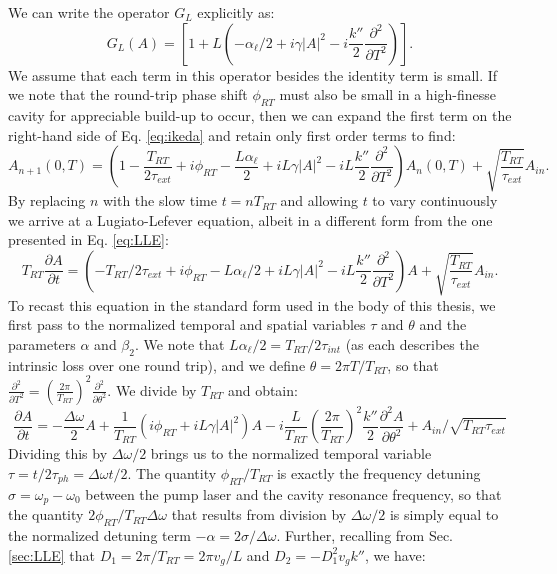 We can write the operator $G_L$ explicitly as:
\begin{equation}
G_L(A)=\left[1+L\left(-\alpha_\ell/2 +i\gamma|A|^2-i\frac{k''}{2} \frac{\partial^2 }{\partial T^2}\right)\right].
\end{equation}
We assume that each term in this operator besides the identity term is small. If we note that the round-trip phase shift $\phi_{RT}$ must also be small in a high-finesse cavity for appreciable build-up to occur, then we can expand the first term on the right-hand side of Eq. \ref{eq:ikeda} and retain only first order terms to find:
\begin{equation}
A_{n+1}(0,T)=\left(1-\frac{T_{RT}}{2\tau_{ext}}+i\phi_{RT}-\frac{L\alpha_\ell}{2}+iL\gamma|A|^2-iL\frac{k''}{2} \frac{\partial^2 }{\partial T^2}\right)A_n(0,T)+\sqrt{\frac{T_{RT}}{\tau_{ext}}}A_{in}. \label{eq:ikedaxp}
\end{equation}
By replacing $n$ with the slow time $t=n T_{RT}$ and allowing $t$ to vary continuously we arrive at a Lugiato-Lefever equation, albeit in a different form from the one presented in Eq. \ref{eq:LLE}:
\begin{equation}
T_{RT}\frac{\partial A}{\partial t}=\left(-T_{RT}/2\tau_{ext}+i\phi_{RT}-L\alpha_\ell/2+iL\gamma|A|^2-iL\frac{k''}{2} \frac{\partial^2 }{\partial T^2}\right)A+\sqrt{\frac{T_{RT}}{\tau_{ext}}}A_{in}.
\end{equation}
To recast this equation in the standard form used in the body of this thesis, we first pass to the normalized temporal and spatial variables $\tau$ and $\theta$ and the parameters $\alpha$ and $\beta_2$. We note that $L\alpha_\ell/2=T_{RT}/2\tau_{int}$ (as each describes the intrinsic loss over one round trip), and we define $\theta=2\pi T/T_{RT}$, so that $\frac{\partial^2}{\partial T^2}=\left(\frac{2\pi}{T_{RT}}\right)^2\frac{\partial^2}{\partial\theta^2}$. We divide by $T_{RT}$ and obtain:
\begin{equation}
\frac{\partial A}{\partial t}=-\frac{\Delta\omega}{2}A+\frac{1}{T_{RT}}\left(i\phi_{RT}+iL\gamma|A|^2\right)A-i\frac{L}{T_{RT}}\left(\frac{2\pi}{T_{RT}}\right)^2\frac{k''}{2} \frac{\partial^2 A }{\partial \theta^2}+A_{in}/\sqrt{T_{RT}\tau_{ext}}
\end{equation}
Dividing this by $\Delta\omega/2$ brings us to the normalized temporal variable $\tau=t/2\tau_{ph}=\Delta\omega t/2$. The quantity $\phi_{RT}/T_{RT}$ is exactly the frequency detuning $\sigma=\omega_p-\omega_0$ between the pump laser and the cavity resonance frequency, so that the quantity $2\phi_{RT}/T_{RT}\Delta\omega$ that results from division by $\Delta\omega/2$ is simply equal to the normalized detuning term $-\alpha=2\sigma/\Delta\omega$. Further, recalling from Sec. \ref{sec:LLE} that $D_1=2\pi/T_{RT}=2\pi v_g/L$ and $D_2=-D_1^2v_gk''$, we have:
